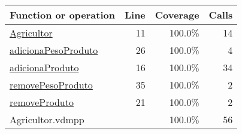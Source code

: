 \begin{longtable}{|l|r|r|r|}
\hline
Function or operation & Line & Coverage & Calls \\
\hline
\hline
\hyperref[Agricultor:11]{Agricultor} & 11&100.0\% & 14 \\
\hline
\hyperref[adicionaPesoProduto:26]{adicionaPesoProduto} & 26&100.0\% & 4 \\
\hline
\hyperref[adicionaProduto:16]{adicionaProduto} & 16&100.0\% & 34 \\
\hline
\hyperref[removePesoProduto:35]{removePesoProduto} & 35&100.0\% & 2 \\
\hline
\hyperref[removeProduto:21]{removeProduto} & 21&100.0\% & 2 \\
\hline
\hline
Agricultor.vdmpp & & 100.0\% & 56 \\
\hline
\end{longtable}

